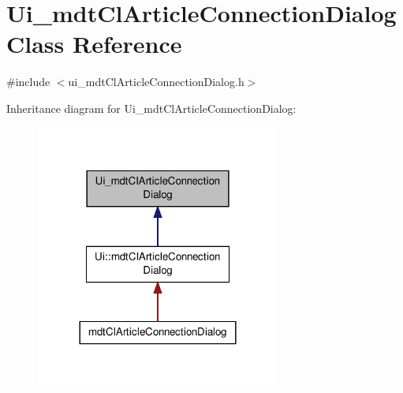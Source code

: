 \hypertarget{class_ui__mdt_cl_article_connection_dialog}{\section{Ui\-\_\-mdt\-Cl\-Article\-Connection\-Dialog Class Reference}
\label{class_ui__mdt_cl_article_connection_dialog}
}


{\ttfamily \#include $<$ui\-\_\-mdt\-Cl\-Article\-Connection\-Dialog.\-h$>$}



Inheritance diagram for Ui\-\_\-mdt\-Cl\-Article\-Connection\-Dialog\-:
\nopagebreak
\begin{figure}[H]
\begin{center}
\leavevmode
\includegraphics[width=228pt]{class_ui__mdt_cl_article_connection_dialog__inherit__graph}
\end{center}
\end{figure}


